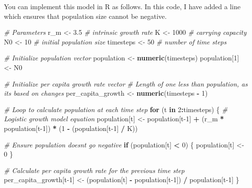 \documentclass[
  a4paper]{book}
\newenvironment{Shaded}{\begin{snugshade}}{\end{snugshade}}
\newcommand{\CommentTok}[1]{\textcolor[rgb]{0.56,0.35,0.01}{\textit{#1}}}
\newcommand{\ControlFlowTok}[1]{\textcolor[rgb]{0.13,0.29,0.53}{\textbf{#1}}}
\newcommand{\DecValTok}[1]{\textcolor[rgb]{0.00,0.00,0.81}{#1}}
\newcommand{\FloatTok}[1]{\textcolor[rgb]{0.00,0.00,0.81}{#1}}
\newcommand{\FunctionTok}[1]{\textcolor[rgb]{0.13,0.29,0.53}{\textbf{#1}}}
\newcommand{\NormalTok}[1]{#1}
\newcommand{\OtherTok}[1]{\textcolor[rgb]{0.56,0.35,0.01}{#1}}
\newcommand{\SpecialCharTok}[1]{\textcolor[rgb]{0.81,0.36,0.00}{\textbf{#1}}}
\begin{document}
You can implement this model in R as follows.
In this code, I have added a line which ensures that population size cannot be negative.

\begin{Shaded}
\begin{Highlighting}[]
\CommentTok{\# Parameters}
\NormalTok{r\_m }\OtherTok{\textless{}{-}} \FloatTok{3.5}  \CommentTok{\# intrinsic growth rate}
\NormalTok{K }\OtherTok{\textless{}{-}} \DecValTok{1000}   \CommentTok{\# carrying capacity}
\NormalTok{N0 }\OtherTok{\textless{}{-}} \DecValTok{10}    \CommentTok{\# initial population size}
\NormalTok{timesteps }\OtherTok{\textless{}{-}} \DecValTok{50}  \CommentTok{\# number of time steps}

\CommentTok{\# Initialize population vector}
\NormalTok{population }\OtherTok{\textless{}{-}} \FunctionTok{numeric}\NormalTok{(timesteps)}
\NormalTok{population[}\DecValTok{1}\NormalTok{] }\OtherTok{\textless{}{-}}\NormalTok{ N0}

\CommentTok{\# Initialize per capita growth rate vector}
\CommentTok{\# Length of one less than population, as it\textquotesingle{}s based on changes}
\NormalTok{per\_capita\_growth }\OtherTok{\textless{}{-}} \FunctionTok{numeric}\NormalTok{(timesteps }\SpecialCharTok{{-}} \DecValTok{1}\NormalTok{)  }

\CommentTok{\# Loop to calculate population at each time step}
\ControlFlowTok{for}\NormalTok{ (t }\ControlFlowTok{in} \DecValTok{2}\SpecialCharTok{:}\NormalTok{timesteps) \{}
  \CommentTok{\# Logistic growth model equation}
\NormalTok{  population[t] }\OtherTok{\textless{}{-}}\NormalTok{ population[t}\DecValTok{{-}1}\NormalTok{] }\SpecialCharTok{+} 
\NormalTok{    (r\_m }\SpecialCharTok{*}\NormalTok{ population[t}\DecValTok{{-}1}\NormalTok{]) }\SpecialCharTok{*}\NormalTok{ (}\DecValTok{1} \SpecialCharTok{{-}}\NormalTok{ (population[t}\DecValTok{{-}1}\NormalTok{] }\SpecialCharTok{/}\NormalTok{ K))}
  
  \CommentTok{\# Ensure population doesn\textquotesingle{}t go negative}
  \ControlFlowTok{if}\NormalTok{ (population[t] }\SpecialCharTok{\textless{}} \DecValTok{0}\NormalTok{) \{}
\NormalTok{    population[t] }\OtherTok{\textless{}{-}} \DecValTok{0}
\NormalTok{  \}}
  
  \CommentTok{\# Calculate per capita growth rate for the previous time step}
\NormalTok{  per\_capita\_growth[t}\DecValTok{{-}1}\NormalTok{] }\OtherTok{\textless{}{-}}\NormalTok{ (population[t] }\SpecialCharTok{{-}} 
\NormalTok{                               population[t}\DecValTok{{-}1}\NormalTok{]) }\SpecialCharTok{/}\NormalTok{ population[t}\DecValTok{{-}1}\NormalTok{]}
\NormalTok{\}}


\end{Highlighting}
\end{Shaded}
\end{document}
